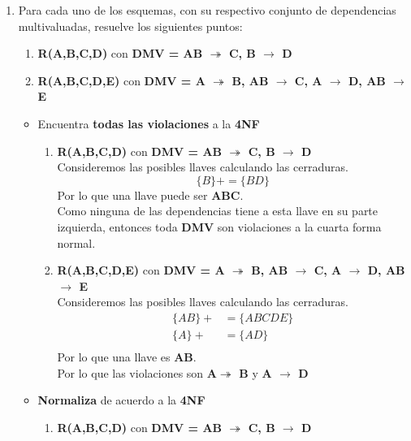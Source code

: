 \documentclass{article}
\begin{document}
\begin{enumerate}
    
    	\item Para  cada  uno  de  los  esquemas,  con  su  respectivo  conjunto  de  dependencias  multivaluadas, resuelve los siguientes puntos:
    	\begin{enumerate}
    		\item \textbf{R(A,B,C,D)} con \textbf{DMV = {AB $\twoheadrightarrow$ C, B $\rightarrow$ D}}
    		\item \textbf{R(A,B,C,D,E)} con \textbf{DMV = { A $\twoheadrightarrow$ B, AB $\rightarrow$ C, A $\rightarrow$ D, AB $\rightarrow$ E}}
    	\end{enumerate}
    
    \begin{itemize}
    	\item Encuentra \textbf{todas las violaciones} a la \textbf{4NF}
    	 \begin{enumerate}
    	     \item \textbf{R(A,B,C,D)} con \textbf{DMV = {AB $\twoheadrightarrow$ C, B $\rightarrow$ D}}\\
    	     Consideremos las posibles llaves calculando las cerraduras.
    	     \[\{B\}+ = \{BD\}\]
    	     Por lo que una llave puede ser \textbf{ABC}.\\
    	     Como ninguna de las dependencias tiene a esta llave en su
    	     parte izquierda, entonces toda \textbf{DMV} son violaciones
    	     a la cuarta
    	     forma normal.
    	     \item  \textbf{R(A,B,C,D,E)} con \textbf{DMV = { A $\twoheadrightarrow$ B, AB $\rightarrow$ C, A $\rightarrow$ D, AB $\rightarrow$ E}} \\
    	     Consideremos las posibles llaves calculando las cerraduras.
    	     \begin{align*}
    	         \{AB\}+ &= \{ABCDE\} \\
    	         \{A\}+ &= \{AD\} \\
    	     \end{align*}
    	     Por lo que una llave es \textbf{AB}.\\
    	     Por lo que las violaciones son 
    	     \textbf{ A$\twoheadrightarrow$ B} y \textbf{A $\rightarrow$ D}
    	 \end{enumerate}
    	\item \textbf{Normaliza} de acuerdo a la \textbf{4NF}
    	\begin{enumerate}
    	    \item \textbf{R(A,B,C,D)} con \textbf{DMV = {AB $\twoheadrightarrow$ C, B $\rightarrow$ D}}\\

\end{enumerate}
\end{itemize}
\end{enumerate}
\end{document}
